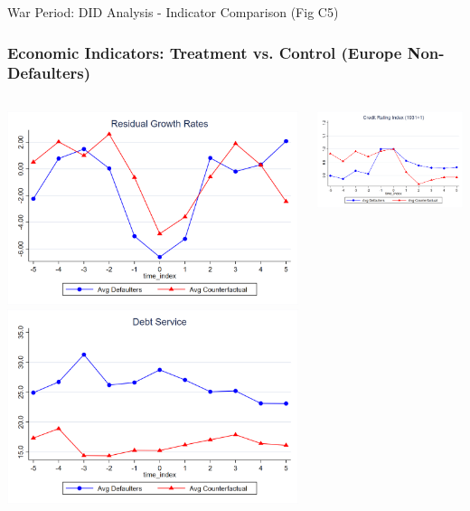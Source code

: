 \documentclass{beamer}
\begin{document}
\begin{frame}{War Period: DID Analysis - Indicator Comparison (Fig C5)}
  \frametitle{Economic Indicators: Treatment vs. Control (Europe Non-Defaulters)}
  \begin{columns}[T] %
    \begin{column}{0.45\textwidth}
      \centering
      \includegraphics[width=0.9\linewidth]{figures/figc5_a.png}
      \includegraphics[width=0.9\linewidth]{figures/figc5_c.png}
    \end{column}
    \begin{column}{0.45\textwidth}
      \centering
      \includegraphics[width=0.9\linewidth]{figures/figc5_b.png}

\end{column}
\end{columns}
\end{frame}
\end{document}
